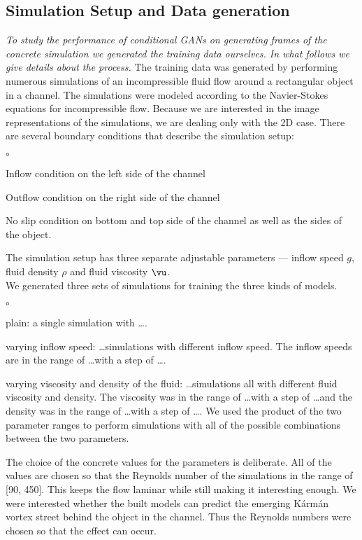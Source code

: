 \documentclass{llncs}
\begin{document}
\subsection{Simulation Setup and Data generation}
\emph{To study the performance of conditional GANs on generating frames of the concrete simulation we generated the training data ourselves. In what follows we give details about the process.} The training data was generated by performing numerous simulations of an incompressible fluid flow around a rectangular object in a channel. The simulations were modeled according to the Navier-Stokes equations for incompressible flow. Because we are interested in the image representations of the simulations, we are dealing only with the 2D case. There are several boundary conditions that describe the simulation setup:
\begin{list}{$\circ$}{}
\item Inflow condition on the left side of the channel
\item Outflow condition on the right side of the channel
\item No slip condition on bottom and top side of the channel as well as the sides of the object.
\end{list}
The simulation setup has three separate adjustable parameters --- inflow speed $g$, fluid density $\rho$ and fluid viscosity $\vu$.
\\
We generated three sets of simulations for training the three kinds of models.
\begin{list}{$\circ$}{}
\item plain: a single simulation with \ldots.
\item varying inflow speed: \ldots simulations with different inflow speed. The inflow speeds are in the range of \ldots with a step of \ldots.
\item varying viscosity and density of the fluid: \ldots simulations all with different fluid viscosity and density. The viscosity was in the range of \ldots with a step of \ldots and the density was in the range of \ldots with a step of \ldots. We used the product of the two parameter ranges to perform simulations with all of the possible combinations between the two parameters.
\end{list}

The choice of the concrete values for the parameters is deliberate. All of the values are chosen so that the Reynolds number of the simulations in the range of [90, 450]. This keeps the flow laminar while still making it interesting enough. We were interested whether the built models can predict the emerging Kármán vortex street behind the object in the channel. Thus the Reynolds numbers were chosen so that the effect can occur.
\end{document}
